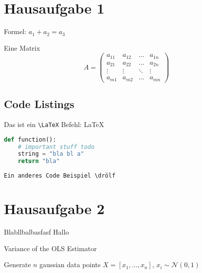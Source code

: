 \section{Hausaufgabe 1}

Formel: $ a_1 + a_2 = a_3 $

Eine Matrix
\begin{equation}
  A = \begin{pmatrix}
    a_{11}  & a_{12} & \ldots & a_{1n} \\
    a_{21}  & a_{22} & \ldots & a_{2n} \\
    \vdots & \vdots & \ddots & \vdots \\
    a_{m1} & a_{m2} & \ldots & a_{mn}
  \end{pmatrix}
\end{equation}

\subsection{Code Listings}

Das ist ein \verb+\LaTeX+ Befehl: \LaTeX

\begin{lstlisting}[caption={Useless Code},language=Python]
def function():
    # important stuff todo
    string = "bla bl a"
    return "bla"
\end{lstlisting}

\begin{verbatim}
Ein anderes Code Beispiel \drölf
\end{verbatim}

\section{Hausaufgabe 2}

Blabllbalbasfasf Hallo


\begin{algorithm}
    \caption{Variance of the OLS Estimator}
    \emptyline

    Generate $n$ gaussian data points $X = [x_1, \ldots , x_n]$, $x_i \sim \mathcal{N}(0, 1)$ \\
\end{algorithm}

